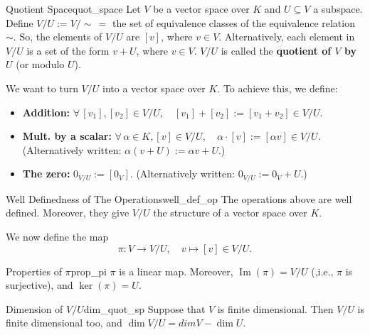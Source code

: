 \begin{definition}{Quotient Space}{quot_space}
	Let $V$ be a vector space over $K$ and $U \subseteq V$ a subspace. Define $V/U := V/\sim \, =$ the set of equivalence classes of the equivalence relation $\sim$. So, the elements of $V/U$ are $[v]$, where $v \in V$. Alternatively, each element in $V/U$ is a set of the form $v + U$, where $v \in V$. $V/U$ is called the \textbf{quotient of $V$ by $U$} (or modulo $U$).
\end{definition}

We want to turn $V/U$ into a vector space over $K$. To achieve this, we define:
\begin{itemize}
	\item[$\bullet$]\textbf{Addition:} $\forall \, [v_1], [v_2] \in V/U, \quad [v_1] + [v_2] := [v_1 + v_2] \in V/U$.
	\item[$\bullet$]\textbf{Mult. by a scalar:} $\forall \, \alpha \in K, [v] \in V/U, \quad \alpha \cdot [v] := [\alpha v] \in V/U$.
	(Alternatively written: $\alpha (v + U) := \alpha v + U$.)
	\item[$\bullet$]\textbf{The zero:} $0_{V/U} := [0_V]$. (Alternatively written: $0_{V/U} := 0_V + U$.) 
\end{itemize}

\begin{proposition}{Well Definedness of The Operations}{well_def_op}
	The operations above are well defined. Moreover, they give $V/U$ the structure of a vector space over $K$.
\end{proposition}

We now define the map
\[
	\pi:V \to V/U, \quad v \mapsto [v] \in V/U.
\]

\begin{proposition}{Properties of $\pi$}{prop_pi}
	$\pi$ is a linear map. Moreover, $\operatorname{Im}(\pi) = V/U$ (,i.e., $\pi$ is surjective), and $\ker(\pi) = U$.
\end{proposition}

\begin{proposition}{Dimension of $V/U$}{dim_quot_sp}
	Suppose that $V$ is finite dimensional. Then $V/U$ is finite dimensional too, and $\dim V/U = dim V - \dim U$.
\end{proposition}

